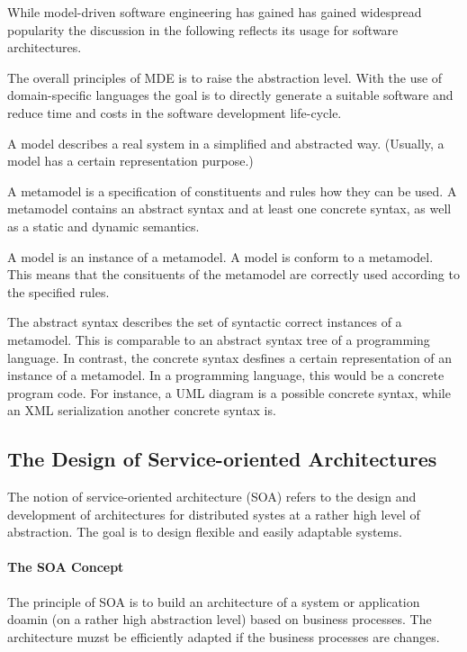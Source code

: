 While model-driven software engineering has gained has gained widespread popularity
the discussion in the following reflects its usage for software architectures.

The overall principles of MDE is to raise the abstraction level. With the use of domain-specific
languages the goal is to directly generate a suitable software and reduce time and costs in
the software development life-cycle. 

\begin{definition}[Model]
A model describes a real system in a simplified and abstracted way.
(Usually, a model has a certain representation purpose.)
\end{definition}

\begin{definition}[Metamodel]
A metamodel is a specification of constituents and rules how they can be used. 
A metamodel contains an abstract syntax and at least one concrete syntax, as well
as a static and dynamic semantics.
\end{definition}


\begin{definition}
A model is an instance of a metamodel. A model is conform to a metamodel.
This means that the consituents of the metamodel are correctly used according to
the specified rules.
\end{definition}

The abstract syntax describes the set of syntactic correct instances of a
metamodel. This is comparable to an abstract syntax tree of a programming language.
In contrast, the concrete syntax desfines a certain representation of an instance of a metamodel.
In a programming language, this would be a concrete program code. 
For instance, a UML diagram is a possible concrete syntax, while
an XML serialization another concrete syntax is.

\subsection{The Design of Service-oriented Architectures}

The notion of service-oriented architecture (SOA) refers to the design
and development of architectures for distributed systes at a rather high
level of abstraction.
The goal is to design flexible and easily adaptable systems. 

\paragraph{The SOA Concept}
The principle of SOA is to build an architecture of a system or
application doamin (on a rather high abstraction level) based on business processes.
The architecture muzst be efficiently adapted if the business  processes are changes.

